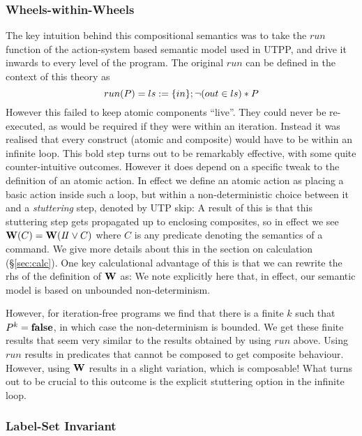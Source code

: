 \subsubsection{Wheels-within-Wheels}

The key intuition behind this compositional semantics was to take the
$run$ function of the action-system based semantic model used in UTPP,
and drive it inwards to every level of the program.
The original $run$ can be defined in the context of this theory as
\[
  run(P) = ls := \{in\} ; \lnot (out \in ls) * P
\]
However this failed to keep atomic components ``live''.
They could never be re-executed,
as would be required if they were within an iteration.
Instead it was realised that every construct (atomic and composite)
would have to be within an infinite loop.
This bold step turns out to be remarkably effective,
with some quite counter-intuitive outcomes.
However it does depend on a specific tweak to the
definition of an atomic action.
In effect we define an atomic action
as placing a basic action inside such a loop,
but within a non-deterministic choice between it
and a \emph{stuttering} step, denoted by UTP skip:
A result of this is that this stuttering step gets
propagated up to enclosing composites,
so in effect we see $\mathbf{W}(C)=\mathbf{W}(I\!I\lor C)$
where $C$ is any predicate denoting the semantics of a command.
We give more details about this in the section on calculation (\S\ref{sec:calc}).
One key calculational advantage of this is that we can rewrite
the rhs of the definition of $\mathbf{W}$ as:
%
We note explicitly here that, in effect,
our semantic model is based on unbounded non-determinism.

However, for iteration-free programs
we find that there is a finite $k$ such that $P^k = \mathbf{false}$,
in which case the non-determinism is bounded.
We get these finite results that seem very similar
to the results obtained by using $run$ above.
Using $run$ results in predicates that cannot be composed
to get composite behaviour.
However, using $\mathbf{W}$ results in a slight variation,
which is composable!
What turns out to be crucial
to this outcome is the explicit stuttering option in the infinite loop.

\subsubsection{Label-Set Invariant}

